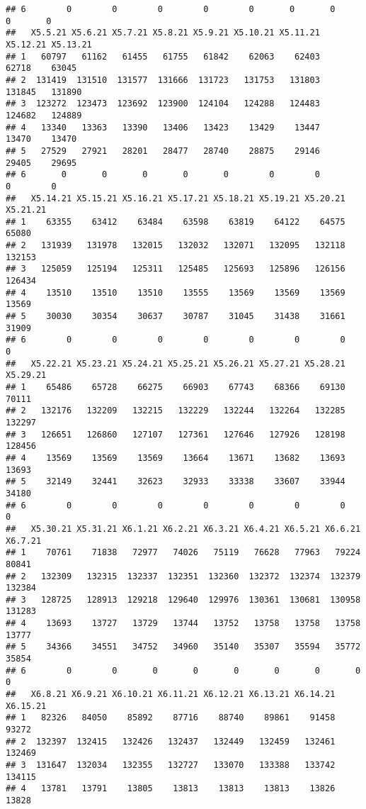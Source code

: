 \documentclass[
]{article}
\begin{document}
\begin{verbatim}
## 6        0        0        0        0        0       0       0       0       0
##   X5.5.21 X5.6.21 X5.7.21 X5.8.21 X5.9.21 X5.10.21 X5.11.21 X5.12.21 X5.13.21
## 1   60797   61162   61455   61755   61842    62063    62403    62718    63045
## 2  131419  131510  131577  131666  131723   131753   131803   131845   131890
## 3  123272  123473  123692  123900  124104   124288   124483   124682   124889
## 4   13340   13363   13390   13406   13423    13429    13447    13470    13470
## 5   27529   27921   28201   28477   28740    28875    29146    29405    29695
## 6       0       0       0       0       0        0        0        0        0
##   X5.14.21 X5.15.21 X5.16.21 X5.17.21 X5.18.21 X5.19.21 X5.20.21 X5.21.21
## 1    63355    63412    63484    63598    63819    64122    64575    65080
## 2   131939   131978   132015   132032   132071   132095   132118   132153
## 3   125059   125194   125311   125485   125693   125896   126156   126434
## 4    13510    13510    13510    13555    13569    13569    13569    13569
## 5    30030    30354    30637    30787    31045    31438    31661    31909
## 6        0        0        0        0        0        0        0        0
##   X5.22.21 X5.23.21 X5.24.21 X5.25.21 X5.26.21 X5.27.21 X5.28.21 X5.29.21
## 1    65486    65728    66275    66903    67743    68366    69130    70111
## 2   132176   132209   132215   132229   132244   132264   132285   132297
## 3   126651   126860   127107   127361   127646   127926   128198   128456
## 4    13569    13569    13569    13664    13671    13682    13693    13693
## 5    32149    32441    32623    32933    33338    33607    33944    34180
## 6        0        0        0        0        0        0        0        0
##   X5.30.21 X5.31.21 X6.1.21 X6.2.21 X6.3.21 X6.4.21 X6.5.21 X6.6.21 X6.7.21
## 1    70761    71838   72977   74026   75119   76628   77963   79224   80841
## 2   132309   132315  132337  132351  132360  132372  132374  132379  132384
## 3   128725   128913  129218  129640  129976  130361  130681  130958  131283
## 4    13693    13727   13729   13744   13752   13758   13758   13758   13777
## 5    34366    34551   34752   34960   35140   35307   35594   35772   35854
## 6        0        0       0       0       0       0       0       0       0
##   X6.8.21 X6.9.21 X6.10.21 X6.11.21 X6.12.21 X6.13.21 X6.14.21 X6.15.21
## 1   82326   84050    85892    87716    88740    89861    91458    93272
## 2  132397  132415   132426   132437   132449   132459   132461   132469
## 3  131647  132034   132355   132727   133070   133388   133742   134115
## 4   13781   13791    13805    13813    13813    13813    13826    13828

\end{verbatim}
\end{document}
